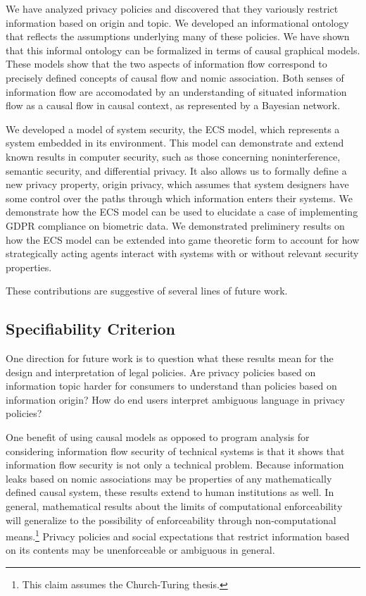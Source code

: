 \documentclass[../thesis.tex]{subfiles}
\begin{document}
We have analyzed privacy policies and discovered
that they variously restrict information based on
origin and topic.
We developed an informational ontology that reflects
the assumptions underlying many of these policies.
We have shown that this informal ontology can
be formalized in terms of causal graphical models.
These models show that the two aspects
of information flow correspond to precisely defined
concepts of causal flow and nomic association.
Both senses of information flow are accomodated by
an understanding of situated information flow as
a causal flow in causal context, as represented
by a Bayesian network.

We developed a model
of system security, the ECS model, which represents
a system embedded in its environment.
This model can
demonstrate and extend known results in computer security,
such as those concerning noninterference, semantic security,
and differential privacy.
It also allows us to formally define a new privacy property,
origin privacy, which assumes that system designers have
some control over the paths through which information enters
their systems.
We demonstrate how the ECS model can be used to elucidate
a case of implementing GDPR compliance on biometric data.
We demonstrated preliminery results on how the ECS model
can be extended into game theoretic form to account for
how strategically acting agents interact with systems
with or without relevant security properties.

These contributions are suggestive of several lines
of future work.

\subsection{Specifiability Criterion}

One direction for future work is to question what
these results mean for the design and interpretation
of legal policies.
Are privacy policies based on information topic harder
for consumers to understand than policies based on
information origin?
How do end users interpret ambiguous language in privacy
policies?

One benefit of using causal models as opposed to
program analysis for considering information flow
security of technical systems is that it shows
that information flow security is not only
a technical problem.
Because information leaks based on nomic associations
may be properties of any mathematically defined causal
system, these results extend to human institutions
as well.
In general, mathematical results about the limits
of computational enforceability will generalize
to the possibility of enforceability through
non-computational means.\footnote{This claim assumes the
Church-Turing thesis.}
Privacy policies and social expectations
that restrict information
based on its contents may be unenforceable or ambiguous
in general.
\end{document}
